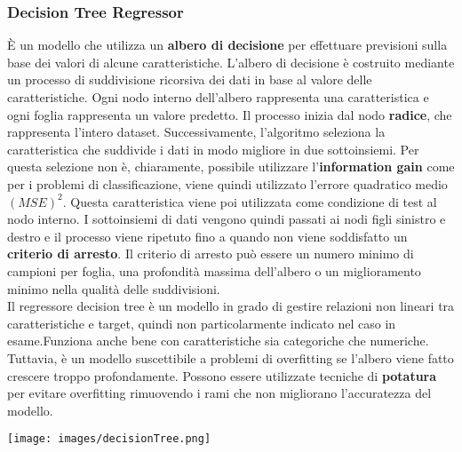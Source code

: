 \documentclass{article}
\begin{document}
        \subsubsection{Decision Tree Regressor}\newline
        È un modello che utilizza un \textbf{albero di decisione} per effettuare previsioni sulla base dei valori di alcune caratteristiche. L'albero di decisione è costruito mediante un processo di suddivisione ricorsiva dei dati in base al valore delle caratteristiche. Ogni nodo interno dell'albero rappresenta una caratteristica e ogni foglia rappresenta un valore predetto.\newline
        Il processo inizia dal nodo \textbf{radice}, che rappresenta l'intero dataset. Successivamente, l'algoritmo seleziona la caratteristica che suddivide i dati in modo migliore in due sottoinsiemi. Per questa selezione non è, chiaramente, possibile utilizzare l'\textbf{information gain} come per i  problemi di classificazione, viene quindi utilizzato l'errore quadratico medio \textbf{$(MSE)^2$}. Questa caratteristica viene poi utilizzata come condizione di test al nodo interno. I sottoinsiemi di dati vengono quindi passati ai nodi figli sinistro e destro e il processo viene ripetuto fino a quando non viene soddisfatto un \textbf{criterio di arresto}. Il criterio di arresto può essere un numero minimo di campioni per foglia, una profondità massima dell'albero o un miglioramento minimo nella qualità delle suddivisioni.\newline\\
        Il regressore decision tree è un modello in grado di gestire relazioni non lineari tra caratteristiche e target, quindi non particolarmente indicato nel caso in esame.\newline Funziona anche bene con caratteristiche sia categoriche che numeriche. Tuttavia, è un modello suscettibile a problemi di overfitting se l'albero viene fatto crescere troppo profondamente. Possono essere utilizzate tecniche di \textbf{potatura} per evitare overfitting rimuovendo i rami che non migliorano l'accuratezza del modello.\newline\\
        \begin{center}
            \texttt{[image: images/decisionTree.png]}
        \end{center}   
        \newpage
\end{document}
